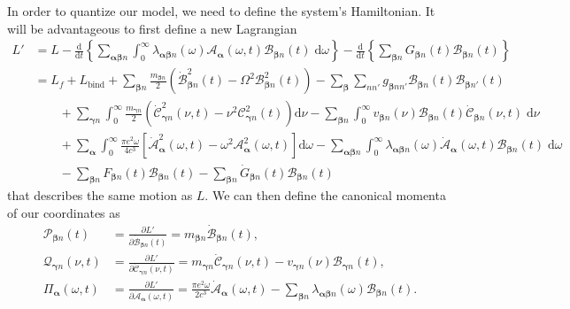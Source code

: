 \documentclass{article}
\begin{document}
In order to quantize our model, we need to define the system's Hamiltonian. It will be advantageous to first define a new Lagrangian
\begin{equation}
\begin{split}
L' &= L - \frac{\mathrm{d}}{\mathrm{d}t}\left\{\sum_{\bm{\alpha}\bm{\beta}n}\int_0^\infty\lambda_{\bm{\alpha}\bm{\beta}n}(\omega)\mathcal{A}_{\bm{\alpha}}(\omega,t)\mathcal{B}_{\bm{\beta}n}(t)\;\mathrm{d}\omega\right\} - \frac{\mathrm{d}}{\mathrm{d}t}\left\{\sum_{\bm{\beta}n}G_{\bm{\beta}n}(t)\mathcal{B}_{\bm{\beta}n}(t)\right\}\\
&= L_f + L_\mathrm{bind} + \sum_{\bm{\beta}n}\frac{m_{\bm{\beta}n}}{2}\left(\dot{\mathcal{B}}_{\bm{\beta}n}^2(t) - \Omega^2\mathcal{B}_{\bm{\beta}n}^2(t)\right) - \sum_{\bm{\beta}}\sum_{nn'}g_{\bm{\beta}nn'}\mathcal{B}_{\bm{\beta}n}(t)\mathcal{B}_{\bm{\beta}n'}(t)\\
&\qquad+ \sum_{\bm{\gamma}n}\int_0^\infty\frac{m_{\bm{\gamma}n}}{2}\left(\dot{\mathcal{C}}_{\bm{\gamma}n}^2(\nu,t) - \nu^2\mathcal{C}_{\bm{\gamma}n}^2(t)\right)\mathrm{d}\nu - \sum_{\bm{\beta}n}\int_0^\infty v_{\bm{\beta}n}(\nu)\mathcal{B}_{\bm{\beta}n}(t)\dot{\mathcal{C}}_{\bm{\beta}n}(\nu,t)\;\mathrm{d}\nu\\
&\qquad + \sum_{\bm{\alpha}}\int_0^\infty\frac{\pi e^2\omega}{4c^3}\left[\dot{\mathcal{A}}_{\bm{\alpha}}^2(\omega,t) - \omega^2\mathcal{A}_{\bm{\alpha}}^2(\omega,t)\right]\mathrm{d}\omega - \sum_{\bm{\alpha}\bm{\beta}n}\int_0^\infty\lambda_{\bm{\alpha}\bm{\beta}n}(\omega)\dot{\mathcal{A}}_{\bm{\alpha}}(\omega,t)\mathcal{B}_{\bm{\beta}n}(t)\;\mathrm{d}\omega\\
&\qquad - \sum_{\bm{\beta}n}F_{\bm{\beta}n}(t)\mathcal{B}_{\bm{\beta}n}(t) - \sum_{\bm{\beta}n}\dot{G}_{\bm{\beta}n}(t)\mathcal{B}_{\bm{\beta}n}(t)
\end{split}
\end{equation}
that describes the same motion as $L$. We can then define the canonical momenta of our coordinates as
\begin{equation}
\begin{split}
\mathcal{P}_{\bm{\beta}n}(t) &= \frac{\partial L'}{\partial \dot{\mathcal{B}}_{\bm{\beta}n}(t)} = m_{\bm{\beta}n}\dot{\mathcal{B}}_{\bm{\beta}n}(t),\\
\mathcal{Q}_{\bm{\gamma}n}(\nu,t) &= \frac{\partial L'}{\partial \dot{\mathcal{C}}_{\bm{\gamma}n}(\nu,t)} = m_{\bm{\gamma}n}\dot{\mathcal{C}}_{\bm{\gamma}n}(\nu,t) - v_{\bm{\gamma}n}(\nu)\mathcal{B}_{\bm{\gamma}n}(t),\\
\mathit{\Pi}_{\bm{\alpha}}(\omega,t) &= \frac{\partial L'}{\partial \dot{\mathcal{A}}_{\bm{\alpha}}(\omega,t)} = \frac{\pi e^2\omega}{2c^3}\dot{\mathcal{A}}_{\bm{\alpha}}(\omega,t) - \sum_{\bm{\beta}n}\lambda_{\bm{\alpha}\bm{\beta}n}(\omega)\mathcal{B}_{\bm{\beta}n}(t).
\end{split}
\end{equation}
\end{document}

